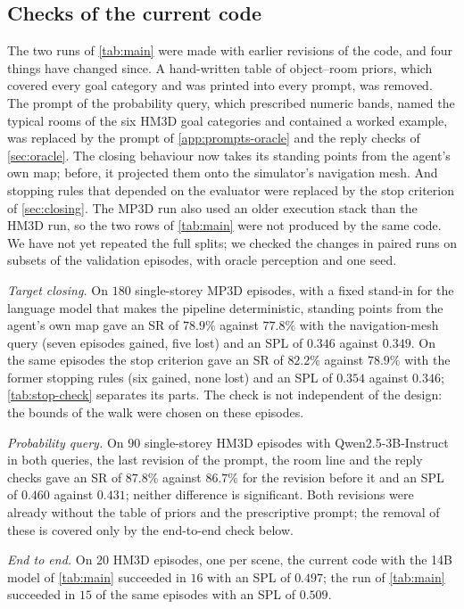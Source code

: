 \documentclass[10pt]{article}
\begin{document}
\subsection{Checks of the current code}\label{sec:results-checks}
The two runs of \cref{tab:main} were made with earlier revisions of the
code, and four things have changed since. A hand-written table of
object--room priors, which covered every goal category and was printed into
every prompt, was removed. The prompt of the probability query, which
prescribed numeric bands, named the typical rooms of the six HM3D goal
categories and contained a worked example, was replaced by the prompt of
\cref{app:prompts-oracle} and the reply checks of \cref{sec:oracle}. The
closing behaviour now takes its standing
points from the agent's own map; before, it projected them onto the
simulator's navigation mesh. And stopping rules that depended on the evaluator
were replaced by the stop criterion of \cref{sec:closing}. The MP3D run also
used an older execution stack than the HM3D run, so the two rows of
\cref{tab:main} were not produced by the same code. We have not yet repeated
the full splits; we checked the changes in paired runs on subsets of the
validation episodes, with oracle perception and one seed.

\emph{Target closing.} On $180$ single-storey MP3D episodes, with a fixed
stand-in for the language model that makes the pipeline deterministic,
standing points from the agent's own map gave an SR of $78.9\%$ against
$77.8\%$ with the navigation-mesh query (seven episodes gained, five lost) and
an SPL of $0.346$ against $0.349$. On the same episodes the stop criterion
gave an SR of $82.2\%$ against $78.9\%$ with the former stopping rules (six
gained, none lost) and an SPL of $0.354$ against $0.346$;
\cref{tab:stop-check} separates its parts. The check is not independent of
the design: the bounds of the walk were chosen on these episodes.

\emph{Probability query.} On $90$ single-storey HM3D episodes with
Qwen2.5-3B-Instruct in both queries, the last revision of the prompt, the room
line and the reply checks gave an SR of $87.8\%$ against $86.7\%$ for the
revision before it and an SPL of $0.460$ against $0.431$; neither difference
is significant. Both revisions were already without the table of priors and
the prescriptive prompt; the removal of these is covered only by the
end-to-end check below.

\emph{End to end.} On $20$ HM3D episodes, one per scene, the current code with
the 14B model of \cref{tab:main} succeeded in $16$ with an SPL of $0.497$; the
run of \cref{tab:main} succeeded in $15$ of the same episodes with an SPL of
$0.509$.
\end{document}
